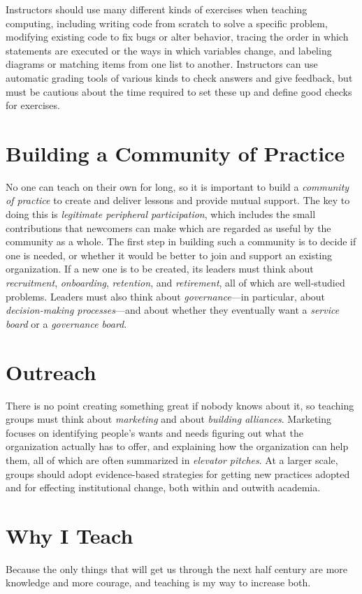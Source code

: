 \documentclass{article}
\begin{document}
Instructors should use many different kinds of exercises when teaching computing,
including writing code from scratch to solve a specific problem,
modifying existing code to fix bugs or alter behavior,
tracing the order in which statements are executed or the ways in which variables change,
and labeling diagrams or matching items from one list to another.
Instructors can use automatic grading tools of various kinds to check answers and give feedback,
but must be cautious about the time required to set these up and define good checks for exercises.

\section{Building a Community of Practice}

No one can teach on their own for long,
so it is important to build a \emph{community of practice}
to create and deliver lessons and provide mutual support.
The key to doing this is \emph{legitimate peripheral participation},
which includes the small contributions that newcomers can make
which are regarded as useful by the community as a whole.
The first step in building such a community is to decide if one is needed,
or whether it would be better to join and support an existing organization.
If a new one is to be created,
its leaders must think about \emph{recruitment}, \emph{onboarding}, \emph{retention}, and \emph{retirement},
all of which are well-studied problems.
Leaders must also think about \emph{governance}---in particular,
about \emph{decision-making processes}---and
about whether they eventually want a \emph{service board} or a \emph{governance board}.

\section{Outreach}

There is no point creating something great if nobody knows about it,
so teaching groups must think about \emph{marketing} and about \emph{building alliances}.
Marketing focuses on identifying people's wants and needs
figuring out what the organization actually has to offer,
and explaining how the organization can help them,
all of which are often summarized in \emph{elevator pitches}.
At a larger scale,
groups should adopt evidence-based strategies for getting new practices adopted
and for effecting institutional change,
both within and outwith academia.

\section{Why I Teach}

Because the only things that will get us through the next half century are more knowledge and more courage,
and teaching is my way to increase both.
\end{document}
